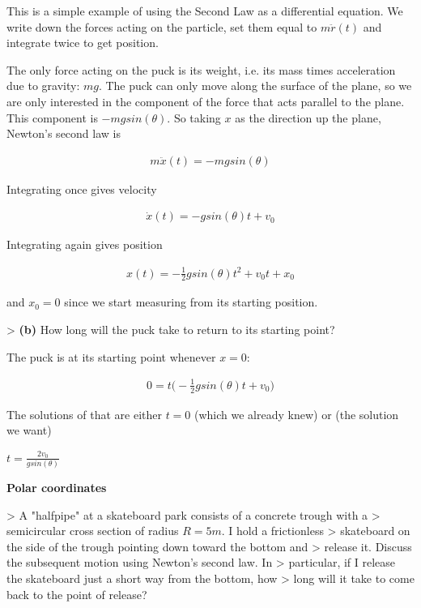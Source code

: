 This is a simple example of using the Second Law as a differential equation. We
write down the forces acting on the particle, set them equal to $m\ddot r(t)$
and integrate twice to get position.

The only force acting on the puck is its weight, i.e. its mass times
acceleration due to gravity: $mg$. The puck can only move along the surface of
the plane, so we are only interested in the component of the force that acts
parallel to the plane. This component is $-mg sin(\theta)$. So taking $x$ as the
direction up the plane, Newton's second law is

\begin{align*}
 m\ddot x(t) = -mgsin(\theta)
\end{align*}

Integrating once gives velocity

\begin{align*}
 \dot x(t) = -g sin(\theta) t + v_0
\end{align*}

Integrating again gives position

\begin{align*}
 x(t) = -\frac{1}{2} g sin(\theta) t^2 + v_0t + x_0
\end{align*}

and $x_0=0$ since we start measuring from its starting position.

> \textbf{(b)} How long will the puck take to return to its starting point?

The puck is at its starting point whenever $x = 0$:

\begin{align*}
0 = t\bigg(-\frac{1}{2} g sin(\theta) t + v_0\bigg)
\end{align*}

The solutions of that are either $t=0$ (which we already knew) or (the solution
we want)

$t = \frac{2v_0}{g sin(\theta)}$

\textbf{Polar coordinates}

> A "halfpipe" at a skateboard park consists of a concrete trough with a
> semicircular cross section of radius $R = 5m$. I hold a frictionless
> skateboard on the side of the trough pointing down toward the bottom and
> release it. Discuss the subsequent motion using Newton's second law. In
> particular, if I release the skateboard just a short way from the bottom, how
> long will it take to come back to the point of release?

